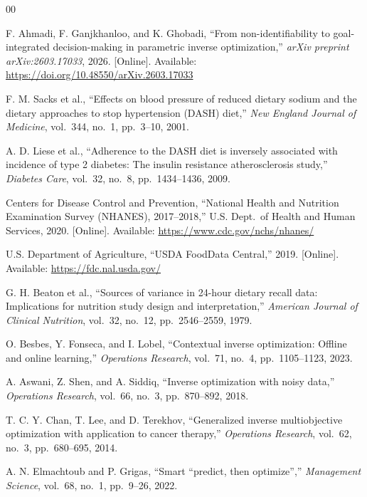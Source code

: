 \documentclass[journal]{IEEEtran}
\begin{document}
\begin{thebibliography}{00}

F. Ahmadi, F. Ganjkhanloo, and K. Ghobadi,
``From non-identifiability to goal-integrated decision-making in
parametric inverse optimization,''
\textit{arXiv preprint arXiv:2603.17033}, 2026.
[Online]. Available: \url{https://doi.org/10.48550/arXiv.2603.17033}

F. M. Sacks et al.,
``Effects on blood pressure of reduced dietary sodium and the dietary
approaches to stop hypertension (DASH) diet,''
\textit{New England Journal of Medicine}, vol.~344, no.~1,
pp.~3--10, 2001.

A. D. Liese et al.,
``Adherence to the DASH diet is inversely associated with incidence
of type 2 diabetes: The insulin resistance atherosclerosis study,''
\textit{Diabetes Care}, vol.~32, no.~8, pp.~1434--1436, 2009.

Centers for Disease Control and Prevention,
``National Health and Nutrition Examination Survey (NHANES),
2017--2018,'' U.S. Dept.\ of Health and Human Services, 2020.
[Online]. Available: \url{https://www.cdc.gov/nchs/nhanes/}

U.S. Department of Agriculture,
``USDA FoodData Central,'' 2019.
[Online]. Available: \url{https://fdc.nal.usda.gov/}

G. H. Beaton et al.,
``Sources of variance in 24-hour dietary recall data: Implications
for nutrition study design and interpretation,''
\textit{American Journal of Clinical Nutrition}, vol.~32, no.~12,
pp.~2546--2559, 1979.

O. Besbes, Y. Fonseca, and I. Lobel,
``Contextual inverse optimization: Offline and online learning,''
\textit{Operations Research}, vol.~71, no.~4, pp.~1105--1123, 2023.

A. Aswani, Z. Shen, and A. Siddiq,
``Inverse optimization with noisy data,''
\textit{Operations Research}, vol.~66, no.~3, pp.~870--892, 2018.

T. C. Y. Chan, T. Lee, and D. Terekhov,
``Generalized inverse multiobjective optimization with application
to cancer therapy,''
\textit{Operations Research}, vol.~62, no.~3, pp.~680--695, 2014.

A. N. Elmachtoub and P. Grigas,
``Smart ``predict, then optimize'',''
\textit{Management Science}, vol.~68, no.~1, pp.~9--26, 2022.


\end{thebibliography}
\end{document}
